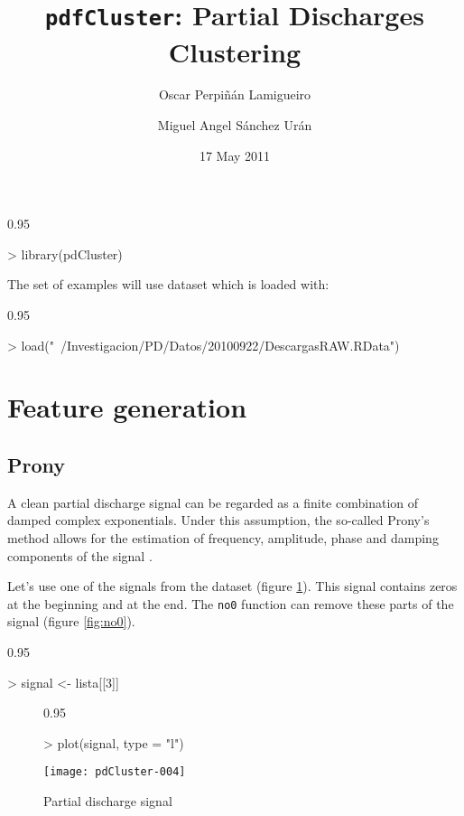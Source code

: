 \documentclass{article}
\renewenvironment{Schunk}{\begin{center}
    \scriptsize
    \begin{boxedminipage}{0.95\textwidth}}{
    \end{boxedminipage}\end{center}}
\begin{document}

\title{\texttt{pdfCluster}: Partial Discharges Clustering} 


\author{Oscar Perpiñán Lamigueiro \and Miguel Angel Sánchez Urán}


\date{17 May 2011}

\maketitle

\begin{Schunk}
\begin{Sinput}
> library(pdCluster)
\end{Sinput}
\end{Schunk}

The set of examples will use dataset which is loaded with:
\begin{Schunk}
\begin{Sinput}
> load("~/Investigacion/PD/Datos/20100922/DescargasRAW.RData")
\end{Sinput}
\end{Schunk}
\section{Feature generation}

\subsection{Prony}
\label{sec:prony}
A clean partial discharge signal can be regarded as a finite combination of
damped complex exponentials. Under this assumption, the so-called
Prony's method allows for the estimation of frequency, amplitude,
phase and damping components of the signal
\cite{Kumaresan.Tufts1982,Hauer.Demeure.ea1990,Kumaresan.Tufts.ea1984}.

Let's use one of the signals from the dataset (figure
\ref{fig:pd_signal}). This signal contains zeros at the beginning and
at the end. The \texttt{no0} function can remove these parts of the
signal (figure \ref{fig:no0}).
\begin{Schunk}
\begin{Sinput}
> signal <- lista[[3]]
\end{Sinput}
\end{Schunk}

\begin{figure}
  \centering
\begin{Schunk}
\begin{Sinput}
> plot(signal, type = "l")
\end{Sinput}
\end{Schunk}
\texttt{[image: pdCluster-004]}
  \caption{Partial discharge signal}
  \label{fig:pd_signal}
\end{figure}
\end{document}
